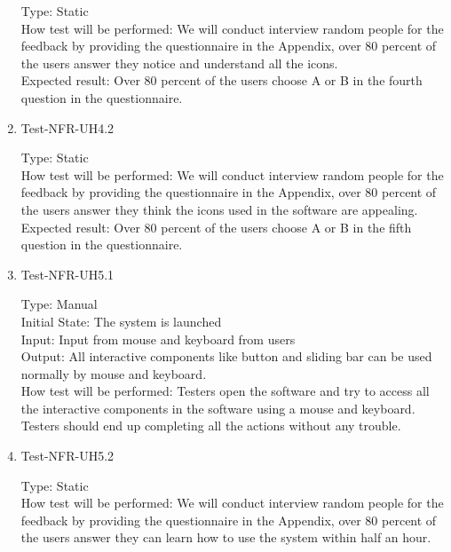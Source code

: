 \documentclass[12pt, titlepage]{article}
\begin{document}
\begin{enumerate}
Type: Static\\

How test will be performed: We will conduct interview random people for the feedback by providing the questionnaire in the Appendix, over 80 percent of the users answer they notice and understand all the icons.\\

Expected result: Over 80 percent of the users choose A or B in the fourth question in the questionnaire.

\item{Test-NFR-UH4.2\\}

Type: Static\\

How test will be performed: We will conduct interview random people for the feedback by providing the questionnaire in the Appendix, over 80 percent of the users answer they think the icons used in the software are appealing.\\

Expected result: Over 80 percent of the users choose A or B in the fifth question in the questionnaire.

\item{Test-NFR-UH5.1\\}

Type: Manual\\

Initial State: The system is launched\\

Input: Input from mouse and keyboard from users\\

Output: All interactive components like button and sliding bar can be used normally by mouse and keyboard.\\

How test will be performed: Testers open the software and try to access all the interactive components in the software using a mouse and keyboard. Testers should end up completing all the actions without any trouble.

\item{Test-NFR-UH5.2\\}

Type: Static\\

How test will be performed: We will conduct interview random people for the feedback by providing the questionnaire in the Appendix, over 80 percent of the users answer they can learn how to use the system within half an hour.\\


\end{enumerate}
\end{document}
